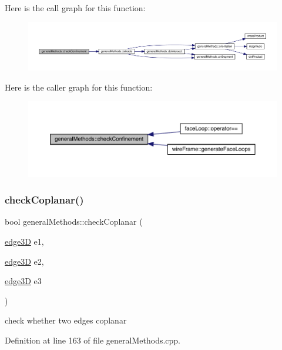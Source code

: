 Here is the call graph for this function\+:
\nopagebreak
\begin{figure}[H]
\begin{center}
\leavevmode
\includegraphics[width=350pt]{namespacegeneral_methods_a2bb810600ec90ec064ea8496ee0ab862_cgraph}
\end{center}
\end{figure}
Here is the caller graph for this function\+:
\nopagebreak
\begin{figure}[H]
\begin{center}
\leavevmode
\includegraphics[width=350pt]{namespacegeneral_methods_a2bb810600ec90ec064ea8496ee0ab862_icgraph}
\end{center}
\end{figure}
\mbox{\label{namespacegeneral_methods_a508d15a0c76920dc4f98cf8da254f9c4}} 
\subsubsection{\texorpdfstring{check\+Coplanar()}{checkCoplanar()}}
{\footnotesize\ttfamily bool general\+Methods\+::check\+Coplanar (\begin{DoxyParamCaption}\item[{\mbox{\hyperlink{structedge3_d}{edge3D}}}]{e1,  }\item[{\mbox{\hyperlink{structedge3_d}{edge3D}}}]{e2,  }\item[{\mbox{\hyperlink{structedge3_d}{edge3D}}}]{e3 }\end{DoxyParamCaption})}

check whether two edges coplanar 

Definition at line 163 of file general\+Methods.\+cpp.

